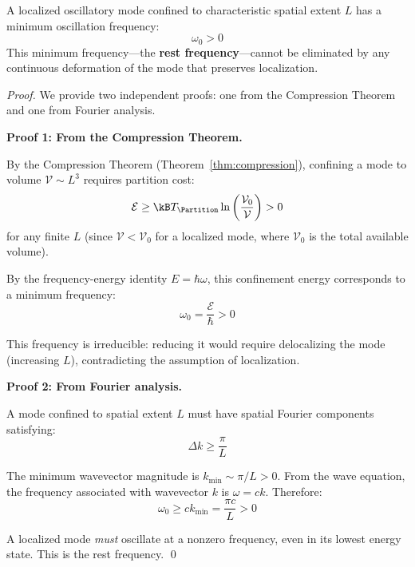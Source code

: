 \begin{theorem}
\label{thm:rest-frequency}
A localized oscillatory mode confined to characteristic spatial extent $L$ has a minimum oscillation frequency:
\begin{equation}
    \omega_0 > 0
    \label{eq:rest-frequency}
\end{equation}
This minimum frequency---the \textbf{rest frequency}---cannot be eliminated by any continuous deformation of the mode that preserves localization.
\end{theorem}

\begin{proof}
We provide two independent proofs: one from the Compression Theorem and one from Fourier analysis.

\textbf{Proof 1: From the Compression Theorem.}

By the Compression Theorem (Theorem~\ref{thm:compression}), confining a mode to volume $\mathcal{V} \sim L^3$ requires partition cost:
\begin{equation}
    \mathcal{E} \geq \kB T_{\Partition} \ln\left(\frac{\mathcal{V}_0}{\mathcal{V}}\right) > 0
\end{equation}
for any finite $L$ (since $\mathcal{V} < \mathcal{V}_0$ for a localized mode, where $\mathcal{V}_0$ is the total available volume).

By the frequency-energy identity $E = \hbar\omega$, this confinement energy corresponds to a minimum frequency:
\begin{equation}
    \omega_0 = \frac{\mathcal{E}}{\hbar} > 0
\end{equation}

This frequency is irreducible: reducing it would require delocalizing the mode (increasing $L$), contradicting the assumption of localization.

\textbf{Proof 2: From Fourier analysis.}

A mode confined to spatial extent $L$ must have spatial Fourier components satisfying:
\begin{equation}
    \Delta k \geq \frac{\pi}{L}
\end{equation}

The minimum wavevector magnitude is $k_{\min} \sim \pi/L > 0$. From the wave equation, the frequency associated with wavevector $k$ is $\omega = ck$. Therefore:
\begin{equation}
    \omega_0 \geq c k_{\min} = \frac{\pi c}{L} > 0
\end{equation}

A localized mode \textit{must} oscillate at a nonzero frequency, even in its lowest energy state. This is the rest frequency. \qed
\end{proof}

